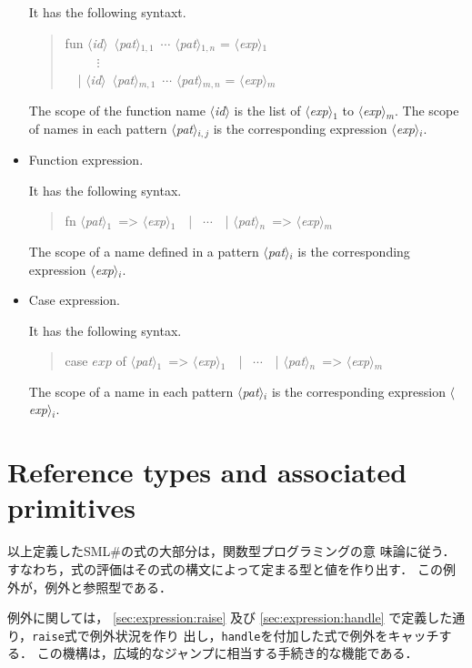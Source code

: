 \documentclass{jbook}
\newcommand{\txt}[2]{#2}
\newcommand{\smlsharp}{SML\#}
\newcommand{\nonterm}[1]{\mbox{$\langle$}{\it #1}\mbox{$\rangle$}}
\newcommand{\term}[1]{\mbox{{\tt #1}}}
\newenvironment{program}{\begin{quote}\begin{tt}}%
                        {\end{tt}\end{quote}}
\begin{document}
\begin{itemize}
	It has the following syntaxt.
\begin{program}
fun \nonterm{id}\ \nonterm{pat}$_{1,1}$\ $\cdots$ \nonterm{pat}$_{1,n}$ = \nonterm{exp}$_1$\\
\ \ \ \ \ $\vdots$\\
\ \ | \nonterm{id}\ \nonterm{pat}$_{m,1}$\ $\cdots$ \nonterm{pat}$_{m,n}$ = \nonterm{exp}$_m$
\end{program}
	The scope of the function name \nonterm{id} is 
the list of \nonterm{exp}$_1$  to \nonterm{exp}$_m$.
	The scope of names in each pattern \nonterm{pat}$_{i,j}$ is the
corresponding expression \nonterm{exp}$_i$.

\item Function expression.

	It has the following syntax.
\begin{program}
fn \nonterm{pat}$_1$\  => \nonterm{exp}$_1$\ \ | \ $\cdots$\ \ | \nonterm{pat}$_n$\  => \nonterm{exp}$_m$
\end{program}
	The scope of a name defined in a pattern \nonterm{pat}$_{i}$
is the corresponding expression \nonterm{exp}$_i$.

\item Case expression.

	It has the following syntax.
\begin{program}
case $exp$ of \nonterm{pat}$_1$\  => \nonterm{exp}$_1$\ \ | \ $\cdots$\ \ | \nonterm{pat}$_n$\  => \nonterm{exp}$_m$
\end{program}
	The scope of a name in each pattern \nonterm{pat}$_{i}$ is
the corresponding expression \nonterm{exp}$_i$.
\end{itemize}
\fi%


\chapter{\txt{参照型とその演算}{Reference types and associated primitives}}
\label{sec:ref}

	以上定義した\smlsharp{}の式の大部分は，関数型プログラミングの意
味論に従う．
	すなわち，式の評価はその式の構文によって定まる型と値を作り出す．
	この例外が，例外と参照型である．

	例外に関しては，
\ref{sec:expression:raise}
及び
\ref{sec:expression:handle}
で定義した通り，\term{raise}式で例外状況を作り
出し，\term{handle}を付加した式で例外をキャッチする．
	この機構は，広域的なジャンプに相当する手続き的な機能である．
\end{document}
